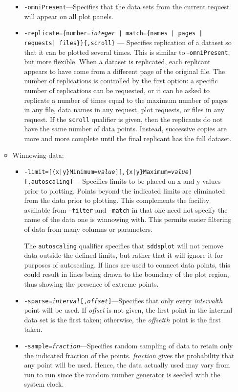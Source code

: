 \begin{itemize}
\begin{itemize}
\begin{itemize}
  \item {\tt -omniPresent}---Specifies that the data sets from the current request will appear on all
plot panels.

  \item {\tt -replicate=\{number={\em integer} | match=\{names | pages | requests| files\}\}\{,scroll\}} --- Specifies replication of a dataset so that it can be plotted several times. This is similar to -{\tt omniPresent}, but more flexible.  When a dataset is replicated,
 each replicant appears to have come from a different page of the original file.  The number of replications is controlled by
 the first option: a specific number of replications can be requested, or it can be asked to replicate a number of times 
 equal to the maximum number of pages in any file, data names in any request, plot requests, or files in any request.  
 If the {\tt scroll} qualifier is given, then the replicants do not have the same number of data points.  Instead, successive
 copies are more and more complete until the final replicant has the full dataset.

  \end{itemize}
\item Winnowing data:
  \begin{itemize}
  \item {\tt -limit=[\{x|y\}Minimum={\em value}][,\{x|y\}Maximum={\em value}][,autoscaling]}---
Specifies limits to be placed on x and y values prior to plotting.  Points beyond the indicated limits are 
eliminated from the data prior to plotting.  This complements the facility available from {\tt -filter} and
{\tt -match} in that one need not specify the name of the data one is winnowing with.  This permits easier
filtering of data from many columns or parameters.

The {\tt autoscaling} qualifier specifies that {\tt sddsplot} will not remove data outside the
defined limits, but rather that it will ignore it for purposes of autoscaling.  If lines are used to
connect data points, this could result in lines being drawn to the boundary of the plot region, thus
showing the presence of extreme points.

  \item {\tt -sparse={\em interval}[,{\em offset}]}---Specifies that only every {\em interval}${
{th}}$ point will be used.  If {\em offset} is not given, the first point in the internal data set is
the first taken; otherwise, the {\em offset}${ {th}}$ point is the first taken.

  \item {\tt -sample={\em fraction}}---Specifies random sampling of data to retain only the indicated
fraction of the points.  {\em fraction} gives the probability that any point will be used.  Hence,
the data actually used may vary from run to run since the random number generator is seeded with the
system clock.


\end{itemize}
\end{itemize}
\end{itemize}
